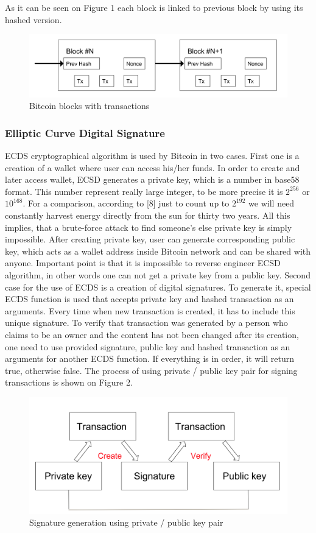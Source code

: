 \documentclass[conference,compsoc]{IEEEtran}
\begin{document}
As it can be seen on Figure 1 each block is linked to previous block by using its hashed version. 

\begin{figure}[h!]
  \centering
  \includegraphics[width=.45\textwidth]{graphics/blockchain.png}
  \caption{Bitcoin blocks with transactions}
  \label{fig:fig1}
\end{figure}

\subsubsection{Elliptic Curve Digital Signature}
ECDS cryptographical algorithm is used by Bitcoin in two cases. 
First one is a creation of a wallet where user can access his/her funds.
In order to create and later access wallet, ECSD generates a private key, which is a number in base58 format. This number represent really large integer, to be more precise it is $2^{256}$ or $10^{168}$. 
For a comparison, according to [8] just to count up to $2^{192}$ we will need constantly harvest energy directly from the sun for thirty two years. 
All this implies, that a brute-force attack to find someone's else private key is simply impossible. 
After creating private key, user can generate corresponding public key, which acts as a wallet address inside Bitcoin network and can be shared with anyone. 
Important point is that it is impossible to reverse engineer ECSD algorithm, in other words one can not get a private key from a public key.
Second case for the use of ECDS is a creation of digital signatures.
To generate it, special ECDS function is used that accepts private key and hashed transaction as an arguments. 
Every time when new transaction is created, it has to include this unique signature.
To verify that transaction was generated by a person who claims to be an owner and the content has not been changed after its creation, one need to use provided signature, public key and hashed transaction as an arguments for another ECDS function. 
If everything is in order, it will return true, otherwise false. 
The process of using private / public key pair for signing transactions is shown on Figure 2.

\begin{figure}[h!]
  \centering
  \includegraphics[width=.45\textwidth]{graphics/private_public.png}
  \caption{Signature generation using private / public key pair}
  \label{fig:fig2}
\end{figure}
\end{document}

